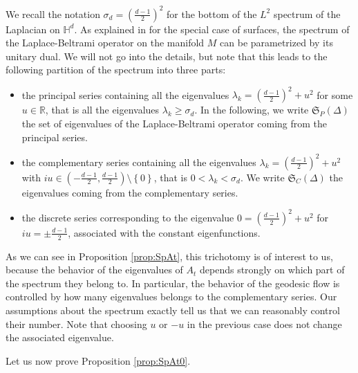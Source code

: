 \documentclass[]{scrartcl}
\newcommand{\dH}{\mathds H}
\newcommand{\R}{\mathds{R}}
\numberwithin{equation}{section}
\numberwithin{figure}{section}
\begin{document}
	We recall the notation $\sigma_d = \left(\frac{d-1}{2}\right)^2$ for the bottom of the $L^2$ spectrum of the Laplacian on $\dH^d$. As explained in \cite{Golubev} for the  special case of surfaces, the spectrum of the Laplace-Beltrami operator on the manifold $M$ can be parametrized by its unitary dual. We will not go into the details, but note that this leads to the following partition of the spectrum into three parts: \begin{itemize}
		\item the principal series containing all the eigenvalues $ \lambda_k = \left( \frac{d-1}{2}\right)^2 + u^2$ for some $u \in \R$, that is all the eigenvalues $\lambda_k \geq \sigma_d$. In the following, we write $\mathfrak S_P(\Delta)$ the set of eigenvalues of the Laplace-Beltrami operator coming from the principal series.
		\item the complementary series containing all the eigenvalues $\lambda_k = \left(\frac{d-1}{2}\right)^2 + u^2$ with $iu \in \left(-\frac{d-1}{2}, \frac{d-1}{2} \right) \setminus \left\{0\right\}$, that is $0 < \lambda_k < \sigma_d $. We write $\mathfrak S_C(\Delta)$ the eigenvalues coming from the complementary series.
		\item the discrete series corresponding to the eigenvalue $0 = \left(\frac{d-1}{2}\right)^2 + u^2$ for $iu = \pm \frac{d-1}{2}$, associated with the constant eigenfunctions. 
	\end{itemize} As we can see in Proposition \ref{prop:SpAt}, this trichotomy is of interest to us, because the behavior of the eigenvalues of $A_t$ depends strongly on which part of the spectrum they belong to. In particular, the behavior of the geodesic flow is controlled by how many eigenvalues belongs to the complementary series. Our assumptions about the spectrum exactly tell us that we can reasonably control their number. Note that choosing $u$ or $-u$ in the previous case does not change the associated eigenvalue.
	

Let us now prove Proposition \ref{prop:SpAt0}.	
\end{document}

